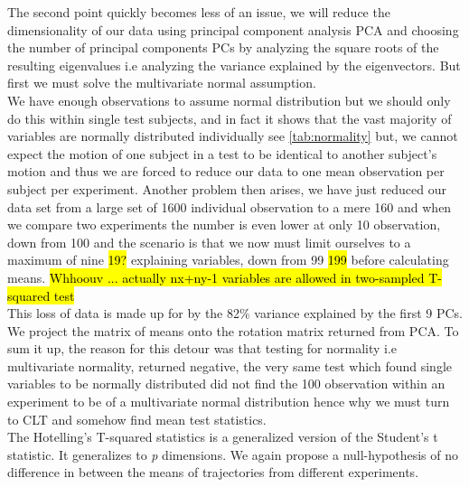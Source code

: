 \documentclass{article}
\begin{document}
The second point quickly becomes less of an issue, we will reduce the dimensionality of our data using principal component analysis PCA and choosing the number of principal components PCs by analyzing the square roots of the resulting eigenvalues i.e analyzing the variance explained by the eigenvectors. But first we must solve the multivariate normal assumption. \\
 We have enough observations to assume normal distribution but we should only do this within single test subjects, and in fact it shows that the vast majority of variables are normally distributed individually see \ref{tab:normality} but, we cannot expect the motion of one subject in a test to be identical to another subject's motion and thus we are forced to reduce our data to one mean observation per subject per experiment. Another problem then arises, we have just reduced our data set from a large set of 1600 individual observation to a mere 160 and when we compare two experiments the number is even lower at only 10 observation, down from 100 and the scenario is that we now must limit ourselves to a maximum of nine \hl{19?} explaining variables, down from 99 \hl{199} before calculating means. \hl{Whhoouv ... actually nx+ny-1 variables are allowed in two-sampled T-squared test}\\
 This loss of data is made up for by the 82\% variance explained by the first 9 PCs. We project the matrix of means onto the rotation matrix returned from PCA. To sum it up, the reason for this detour was that testing for normality i.e multivariate normality, returned negative, the very same test which found single variables to be normally distributed did not find the 100 observation within an experiment to be of a multivariate normal distribution hence why we must turn to CLT and somehow find mean test statistics.\\
The Hotelling's T-squared statistics is a generalized version of the Student's t statistic. It generalizes to \textit{p} dimensions. We again propose a null-hypothesis of no difference in between the means of trajectories from different experiments. 


\end{document}
